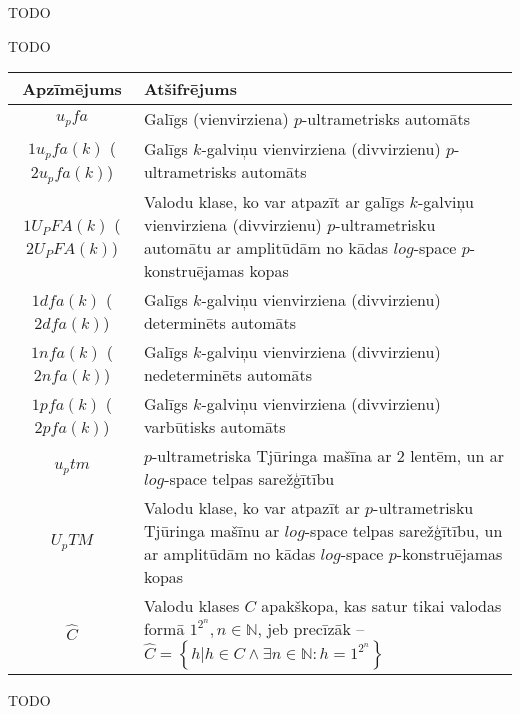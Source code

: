\documentclass{ludis}
\begin{document}
\maketitle

\begin{abstract-lv}
TODO
\end{abstract-lv}
\clearpage

\begin{abstract-en}
TODO
\end{abstract-en}


\tableofcontents

\setlength\LTleft{0pt}
\setlength\LTright{0pt}
\begin{longtable}{| c | p{28em} |}
  \hline
  \textbf{Apzīmējums} & \textbf{Atšifrējums}\\ 
  \endhead

  \hline
  $u_pfa$ & Galīgs (vienvirziena) $p$-ultrametrisks automāts\\
  $1u_pfa(k)$ ($2u_pfa(k)$) &  Galīgs $k$-galviņu vienvirziena (divvirzienu) $p$-ultrametrisks automāts\\
  $1U_PFA(k)$ ($2U_PFA(k)$) &  Valodu klase, ko var atpazīt ar galīgs $k$-galviņu vienvirziena (divvirzienu) $p$-ultrametrisku automātu ar amplitūdām no kādas $log$-space $p$-konstruējamas kopas\\
  $1dfa(k)$ ($2dfa(k)$) &  Galīgs $k$-galviņu vienvirziena (divvirzienu) determinēts automāts\\
  $1nfa(k)$ ($2nfa(k)$) &  Galīgs $k$-galviņu vienvirziena (divvirzienu) nedeterminēts automāts\\
  $1pfa(k)$ ($2pfa(k)$) &  Galīgs $k$-galviņu vienvirziena (divvirzienu) varbūtisks automāts\\
  $u_ptm$ &  $p$-ultrametriska Tjūringa mašīna ar $2$ lentēm, un ar $log$-space telpas sarežģītību\\
  $U_pTM$ &  Valodu klase, ko var atpazīt ar $p$-ultrametrisku Tjūringa mašīnu ar $log$-space telpas sarežģītību, un ar amplitūdām no kādas $log$-space $p$-konstruējamas kopas\\
  $\widehat{C}$ & Valodu klases $C$ apakškopa, kas satur tikai valodas formā $1^{2^n}, n \in \mathbb{N}$, jeb precīzāk -- $\widehat{C} = \left\{ h | h \in C \wedge \exists n \in \mathbb{N} : h = 1^{2^n} \right\}$\\
  \hline
\end{longtable}

TODO
\end{document}
